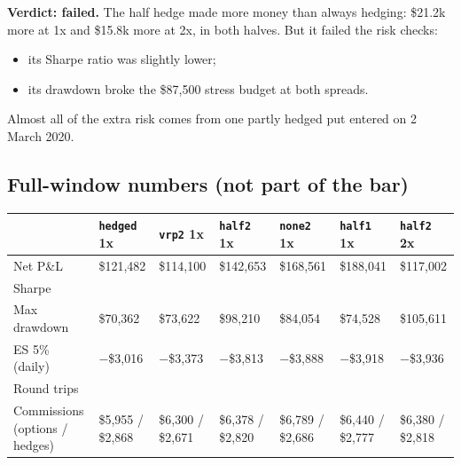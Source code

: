 \documentclass{article}
\begin{document}
\textbf{Verdict: failed.} The half hedge made more money than always hedging: \$21.2k more at 1x and \$15.8k more at 2x, in both halves. But it failed the risk checks:

\begin{itemize}

\item its Sharpe ratio was slightly lower;

\item its drawdown broke the \$87,500 stress budget at both spreads.

\end{itemize}

Almost all of the extra risk comes from one partly hedged put entered on 2 March 2020.

\subsection{Full-window numbers (not part of the bar)}

\begin{center}\small
\begin{tabularx}{\linewidth}{>{\raggedright\arraybackslash}X >{\raggedright\arraybackslash}X >{\raggedright\arraybackslash}X >{\raggedright\arraybackslash}X >{\raggedright\arraybackslash}X >{\raggedright\arraybackslash}X >{\raggedright\arraybackslash}X}
\toprule
\textbf{} & \textbf{\texttt{hedged} 1x} & \textbf{\texttt{vrp2} 1x} & \textbf{\texttt{half2} 1x} & \textbf{\texttt{none2} 1x} & \textbf{\texttt{half1} 1x} & \textbf{\texttt{half2} 2x} \\
\midrule
Net P\&L & \$121,482 & \$114,100 & \$142,653 & \$168,561 & \$188,041 & \$117,002 \\
Sharpe & 0.52 & 0.51 & 0.50 & 0.64 & 0.65 & 0.41 \\
Max drawdown & \$70,362 & \$73,622 & \$98,210 & \$84,054 & \$74,528 & \$105,611 \\
ES 5\% (daily) & \ensuremath{-}\$3,016 & \ensuremath{-}\$3,373 & \ensuremath{-}\$3,813 & \ensuremath{-}\$3,888 & \ensuremath{-}\$3,918 & \ensuremath{-}\$3,936 \\
Round trips & 182 & 208 & 195 & 208 & 196 & 195 \\
Commissions (options /\allowbreak{} hedges) & \$5,955 /\allowbreak{} \$2,868 & \$6,300 /\allowbreak{} \$2,671 & \$6,378 /\allowbreak{} \$2,820 & \$6,789 /\allowbreak{} \$2,686 & \$6,440 /\allowbreak{} \$2,777 & \$6,380 /\allowbreak{} \$2,818 \\
\bottomrule
\end{tabularx}
\end{center}
\end{document}

